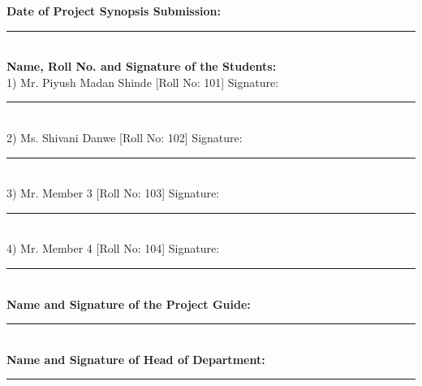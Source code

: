 \documentclass[12pt,a4paper]{report}
\begin{document}
\vspace{1.5cm}
\noindent \textbf{Date of Project Synopsis Submission:} \rule{4cm}{0.15mm}\\[1cm]
\noindent \textbf{Name, Roll No. and Signature of the Students:}\\[0.5cm]
1) Mr. Piyush Madan Shinde \hspace{0.5cm} [Roll No: 101] \hspace{1cm} Signature: \rule{3cm}{0.15mm}\\[0.5cm]
2) Ms. Shivani Danwe \hspace{1.35cm} [Roll No: 102] \hspace{1cm} Signature: \rule{3cm}{0.15mm}\\[0.5cm]
3) Mr. Member 3 \hspace{1.9cm} [Roll No: 103] \hspace{1cm} Signature: \rule{3cm}{0.15mm}\\[0.5cm]
4) Mr. Member 4 \hspace{1.9cm} [Roll No: 104] \hspace{1cm} Signature: \rule{3cm}{0.15mm}\\[1.5cm]

\noindent \textbf{Name and Signature of the Project Guide:} \rule{6cm}{0.15mm}\\[1.5cm]
\noindent \textbf{Name and Signature of Head of Department:} \rule{6cm}{0.15mm}
\end{document}
